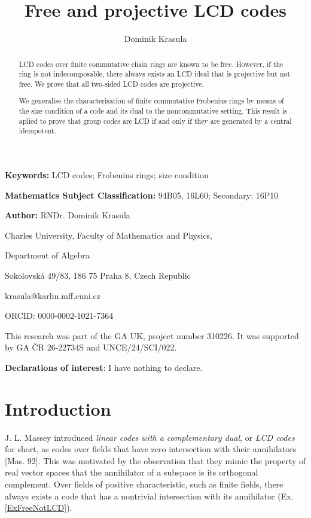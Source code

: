 \documentclass{article}
\title{Free and projective LCD codes}
\author{Dominik Krasula
}
\theoremstyle{plain}
\theoremstyle{plain}
\theoremstyle{remark}
\theoremstyle{plain}
\begin{document}
 \maketitle 
\begin{abstract}
LCD codes over finite commutative chain rings are known to be free. However, if the ring is not indecomposable, there always exists an LCD ideal that is projective but not free.  We prove that all two-sided LCD codes are projective. 

We generalise the characterisation of finite commutative Frobenius rings by means of the size condition of a code and its dual to the noncommutative setting. This result is aplied to prove that group codes are LCD if and only if they are generated by a central idempotent. 
\end{abstract}
\textbf{Keywords:}  LCD codes; Frobenius rings; size condition

\medskip 

\noindent \textbf{Mathematics Subject Classification:} 94B05, 16L60; Secondary: 16P10 

\medskip 

\noindent \textbf{Author:} RNDr. Dominik Krasula

Charles University, Faculty of Mathematics and Physics, 

Department of Algebra

Sokolovská 49/83, 186 75 Praha 8, Czech Republic

krasula@karlin.mff.cuni.cz

ORCID: 0000-0002-1021-7364

\medskip  

\noindent  This research was part of the GA UK, project number 310226. It was supported by  GA ČR 26-22734S and  UNCE/24/SCI/022.%

\medskip  

\noindent \textbf{Declarations of interest}: I have nothing to declare. 


\medskip 

\section{Introduction}



J. L. Massey introduced \textit{linear codes with a complementary dual}, or \textit{LCD codes} for short,  as codes over fields that have zero intersection with their annihilators [Mas. 92]. This was motivated by the observation that they mimic the property of real vector spaces that the annihilator of a subspace is its orthogonal complement.  Over fields of positive characteristic, such as finite fields, there always exists a code that has a nontrivial intersection with its annihilator (Ex. \ref{ExFreeNotLCD}).
\end{document}
